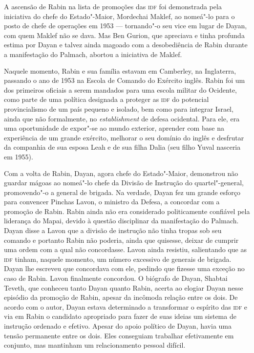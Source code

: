 A ascensão de Rabin na lista de promoções das \textsc{idf} foi demonstrada pela
iniciativa do chefe do Estado"-Maior, Mordechai Maklef, ao nomeá"-lo
para o posto de chefe de operações em 1953 --- tornando"-o seu vice em lugar
de Dayan, com quem Maklef não se dava. Mas Ben Gurion, que apreciava e
tinha profunda estima por Dayan e talvez ainda magoado com a
desobediência de Rabin durante a manifestação do Palmach, abortou a
iniciativa de Maklef.

Naquele momento, Rabin e sua família estavam em Camberley, na Inglaterra,
passando o ano de 1953 na Escola de Comando do Exército inglês. Rabin
foi um dos primeiros oficiais a serem mandados para uma escola militar
do Ocidente, como parte de uma política designada a proteger as \textsc{idf} do
potencial provincialismo de um país pequeno e isolado, bem como para integrar Israel,
ainda que não formalmente, no \emph{establishment} de defesa
ocidental. Para ele, era uma oportunidade de expor"-se ao mundo
exterior, aprender com base na experiência de um grande exército,
melhorar o seu domínio do inglês e desfrutar da companhia de sua esposa
Leah e de sua filha Dalia (seu filho Yuval nasceria em 1955).

Com a volta de Rabin, Dayan, agora chefe do Estado"-Maior,
demonstrou não guardar mágoas ao nomeá"-lo chefe da Divisão de Instrução
do quartel"-general, promovendo"-o a general de brigada. Na verdade, Dayan
fez um grande esforço para convencer Pinchas Lavon, o ministro da
Defesa, a concordar com a promoção de Rabin. Rabin ainda não era considerado
politicamente confiável pela liderança do Mapai, devido à questão
disciplinar da manifestação do Palmach. Dayan disse a Lavon que a
divisão de instrução não tinha tropas sob seu comando e portanto Rabin
não poderia, ainda que quisesse, deixar de cumprir uma ordem com a qual
não concordasse. Lavon ainda resistiu, salientando que as \textsc{idf} tinham,
naquele momento, um número excessivo de generais de brigada. Dayan lhe
escreveu que concordava com ele, pedindo que fizesse uma exceção no caso
de Rabin. Lavon finalmente concordou. O biógrafo de Dayan, Shabtai
Teveth, que conheceu tanto Dayan quanto Rabin, acerta ao elogiar Dayan
nesse episódio da promoção de Rabin, apesar da incômoda relação entre os
dois. De acordo com o autor, Dayan estava determinado a transformar o
espírito das \textsc{idf} e via em Rabin o candidato apropriado para fazer de
suas ideias um sistema de instrução ordenado e efetivo. Apesar do
apoio político de Dayan, havia uma tensão permanente entre os dois. Eles
conseguiam trabalhar efetivamente em conjunto, mas mantinham um
relacionamento pessoal difícil.

